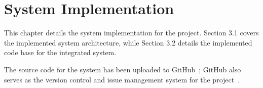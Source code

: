 \chapter{System Implementation}

This chapter details the system implementation for the project.
Section 3.1 covers the implemented system architecture, while Section
3.2 details the implemented code base for the integrated system.

The source code for the system has been uploaded to GitHub~\cite{gh-magor};
GitHub also serves as the version control and issue management
system for the project~\cite{gh-magor-is}.
